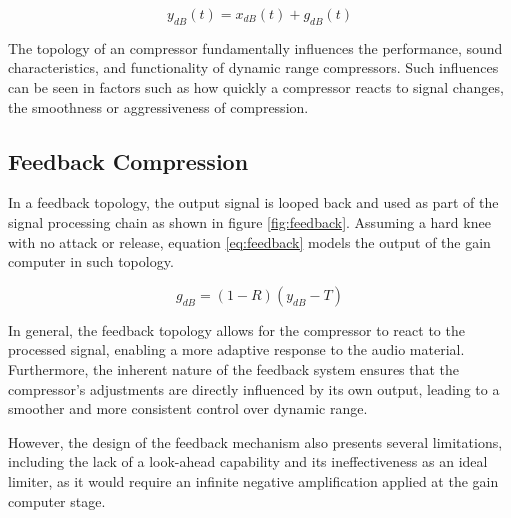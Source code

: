 \documentclass[10pt]{article}
\begin{document}
\begin{multicols*}{2}
                \begin{equation} \label{eq:gen-topology}
                    y_{dB}(t)=x_{dB}(t)+g_{dB}(t)
                \end{equation}
            
            \noindent The topology of an compressor fundamentally influences the performance, sound characteristics, and functionality of dynamic range compressors. Such influences can be seen in factors such as how quickly a compressor reacts to signal changes, the smoothness or aggressiveness of compression.

            \subsection{Feedback Compression}
                In a feedback topology, the output signal is looped back and used as part of the signal processing chain as shown in figure \ref{fig:feedback}. Assuming a hard knee with no attack or release, equation \ref{eq:feedback} models the output of the gain computer in such topology.\par

                    \begin{equation} \label{eq:feedback}
                        g_{dB}=(1-R)(y_{dB}-T)
                    \end{equation}
                
                \noindent In general, the feedback topology allows for the compressor to react to the processed signal, enabling a more adaptive response to the audio material. Furthermore, the inherent nature of the feedback system ensures that the compressor's adjustments are directly influenced by its own output, leading to a smoother and more consistent control over dynamic range.\par
                However, the design of the feedback mechanism also presents several limitations, including the lack of a look-ahead capability and its ineffectiveness as an ideal limiter, as it would require an infinite negative amplification applied at the gain computer stage.

                    \noindent
                    \begin{minipage}{\linewidth}

                        \centering

                        \begin{tikzpicture}


\end{tikzpicture}
\end{minipage}
\end{multicols*}
\end{document}
